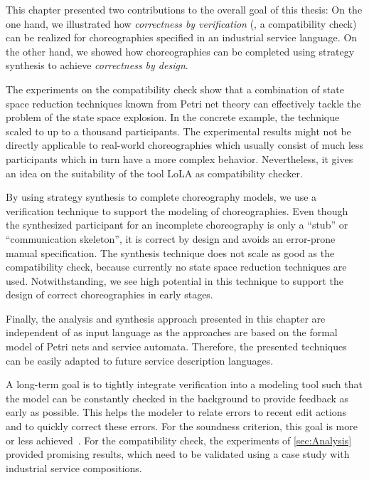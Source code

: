 This chapter presented two contributions to the overall goal of this thesis: On the one hand, we illustrated how \emph{correctness by verification} (\ie, a compatibility check) can be realized for choreographies specified in an industrial service language. On the other hand, we showed how choreographies can be completed using strategy synthesis to achieve \emph{correctness by design}.

The experiments on the compatibility check show that a combination of state space reduction techniques known from Petri net theory can effectively tackle the problem of the state space explosion. In the concrete example, the technique scaled to up to a thousand participants. The experimental results might not be directly applicable to real-world choreographies which usually consist of much less participants which in turn have a more complex behavior. Nevertheless, it gives an idea on the suitability of the tool LoLA as compatibility checker.

By using strategy synthesis to complete choreography models, we use a verification technique to support the modeling of choreographies. Even though the synthesized participant for an incomplete choreography is only a ``stub'' or ``communication skeleton'', it is correct by design and avoids an error-prone manual specification. The synthesis technique does not scale as good as the compatibility check, because currently no state space reduction techniques are used. Notwithstanding, we see high potential in this technique to support the design of correct choreographies in early stages.

Finally, the analysis and synthesis approach presented in this chapter are independent of  as input language as the approaches are based on the formal model of Petri nets and service automata. Therefore, the presented techniques can be easily adapted to future service description languages.

\bigskip

A long-term goal is to tightly integrate verification into a modeling tool such that the model can be constantly checked in the background to provide feedback as early as possible. This helps the modeler to relate errors to recent edit actions and to quickly correct these errors. For the soundness criterion, this goal is more or less achieved~\cite{FahlandWJKLVW_2009_bpm}. For the compatibility check, the experiments of \autoref{sec:Analysis} provided promising results, which need to be validated using a case study with industrial service compositions.

